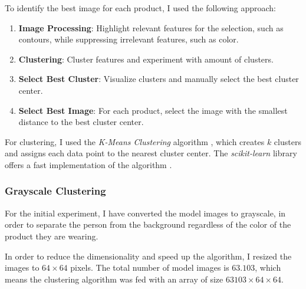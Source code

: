 \documentclass[12pt]{report}
\begin{document}
To identify the best image for each product, I used the following approach:
\begin{enumerate}
	\item \textbf{Image Processing}: Highlight relevant features for the selection, such as contours, while suppressing irrelevant features, such as color.
	\item \textbf{Clustering}: Cluster features and experiment with amount of clusters.
	\item \textbf{Select Best Cluster}: Visualize clusters and manually select the best cluster center.
	\item \textbf{Select Best Image}: For each product, select the image with the smallest distance to the best cluster center.
\end{enumerate}


For clustering, I used the \textit{K-Means Clustering} algorithm \cite{noauthor_k-means_2018}, which creates $k$ clusters and assigns each data point to the nearest cluster center. The \textit{scikit-learn} library offers a fast implementation of the algorithm \cite{noauthor_sklearn.cluster.kmeans_nodate}.

\subsubsection{Grayscale Clustering}
For the initial experiment, I have converted the model images to grayscale, in order to separate the person from the background regardless of the color of the product they are wearing. 

In order to reduce the dimensionality and speed up the algorithm, I resized the images to $64\times64$ pixels. The total number of model images is $63.103$, which means the clustering algorithm was fed with an array of size $63103\times64\times64$.


\end{document}
